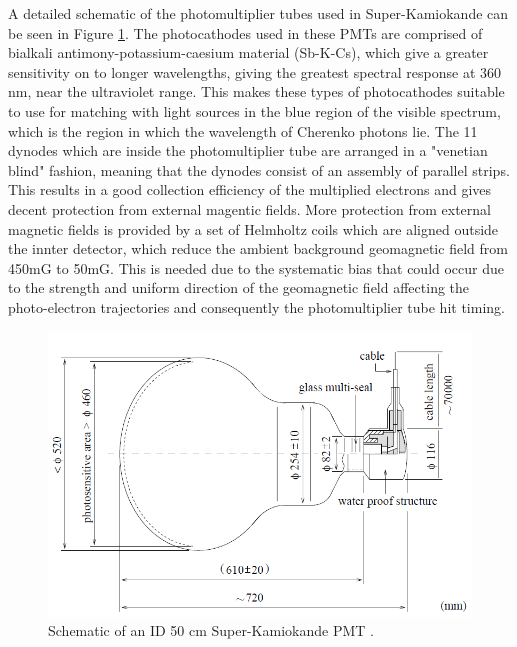 A detailed schematic of the photomultiplier tubes used in Super-Kamiokande can be seen in Figure \ref{fig:PMTdiagram}. The photocathodes used in these PMTs are comprised of bialkali antimony-potassium-caesium material (Sb-K-Cs), which give a greater sensitivity on to longer wavelengths, giving the greatest spectral response at 360 nm, near the ultraviolet range. This makes these types of photocathodes suitable to use for matching with light sources in the blue region of the visible spectrum, which is the region in which the wavelength of Cherenko photons lie. The 11 dynodes which are inside the photomultiplier tube are arranged in a "venetian blind" fashion, meaning that the dynodes consist of an assembly of parallel strips. This results in a good collection efficiency of the multiplied electrons and gives decent protection from external magentic fields. More protection from external magnetic fields is provided by a set of Helmholtz coils which are aligned outside the innter detector, which reduce the ambient background geomagnetic field from 450mG to 50mG. This is needed due to the systematic bias that could occur due to the strength and uniform direction of the geomagnetic field affecting the photo-electron trajectories and consequently the photomultiplier tube hit timing. 

\begin{figure}
    \includegraphics[width=\textwidth]{Figures/PMT_schematic.png}
\caption{Schematic of an ID 50 cm Super-Kamiokande PMT \cite{fukudaSuperKamiokandeDetector2003}.}
    \label{fig:PMTdiagram}
\end{figure}


